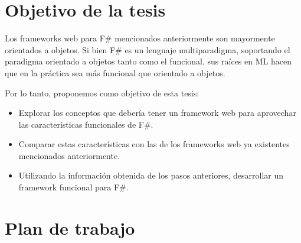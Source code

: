 \documentclass[12pt]{article}
\begin{document}
\section{Objetivo de la tesis}

Los frameworks web para F\# mencionados anteriormente son mayormente orientados a objetos. Si bien F\# es un lenguaje multiparadigma, soportando el paradigma orientado a objetos tanto como el funcional, sus raíces en ML hacen que en la práctica sea más funcional que orientado a objetos.

Por lo tanto, proponemos como objetivo de esta tesis:
\begin{itemize}
	\item Explorar los conceptos que debería tener un framework web para aprovechar las características funcionales de F\#.
	\item Comparar estas características con las de los frameworks web ya existentes mencionados anteriormente.
	\item Utilizando la información obtenida de los pasos anteriores, desarrollar un framework funcional para F\#. 
\end{itemize}

\section{Plan de trabajo}

\printglossaries
\end{document}
